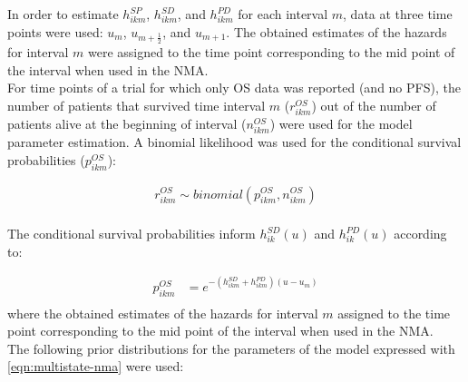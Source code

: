 \documentclass[11pt,final,fleqn]{article}\usepackage[]{graphicx}\usepackage[]{color}
\theoremstyle{plain}
\newcounter{subsubsubsection}[subsubsection]
\begin{document}
{In order to estimate $h_{ikm}^{SP}$, $h_{ikm}^{SD}$, and $h_{ikm}^{PD}$ for each interval $m$,  data at three time points were used: $u_{m}$, $u_{m+\frac{1}{2}}$, and $u_{m+1}$. The obtained estimates of the hazards for interval $m$ were assigned to the time point corresponding to the mid point of the interval when used in the NMA.
\\

For time points of a trial for which only OS data was reported (and no PFS), the number of patients that survived time interval $m$ ($r_{ikm}^{OS}$) out of the number of patients alive at the beginning of interval ($n_{ikm}^{OS}$) were used for the model parameter estimation. A binomial likelihood was used for the conditional survival probabilities ($p_{ikm}^{OS}$):


\begin{equation} \label{eqn:binomial_likelihood}
\begin{aligned}
r_{ikm}^{OS} \sim binomial(p_{ikm}^{OS},n_{ikm}^{OS})
\end{aligned}
\end{equation}
\\
The conditional survival probabilities inform $h_{ik}^{SD}(u)$ and $h_{ik}^{PD}(u)$ according to:

\begin{equation} \label{eqn:diff_equations_OS}
\begin{aligned}
p_{ikm}^{OS} &= e^{-(h_{ikm}^{SD}+h_{ikm}^{PD})(u-u_{m})} \\
\end{aligned}
\end{equation}
where the obtained estimates of the hazards for interval $m$ assigned to the time point corresponding to the mid point of the interval when used in the NMA.
\\

The following prior distributions for the parameters of the model expressed with \autoref{eqn:multistate-nma} were used:

}
\end{document}
